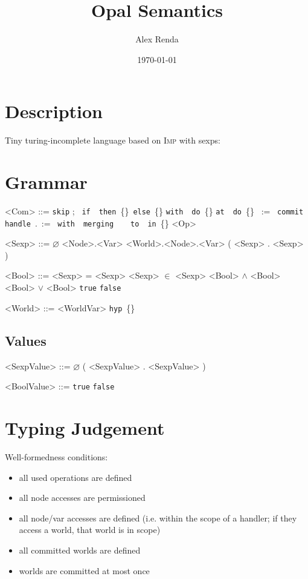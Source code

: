 \documentclass{article}
\title{Opal Semantics}
\author{Alex Renda}
\date{\today}
\newcommand{\skipcom}{\texttt{skip}}
\newcommand{\seqcom}[2]{#1;\ #2}
\newcommand{\ifcom}[3]{\texttt{if}\ #1\ \texttt{then}\ \{#2\}\ \texttt{else}\ \{#3\}}
\newcommand{\withcom}[2]{\texttt{with}\ #1\ \texttt{do}\ \{#2\}}
\newcommand{\atcom}[2]{\texttt{at}\ #1\ \texttt{do}\ \{#2\}}
\newcommand{\assgncom}[2]{#1\ :=\ #2}
\newcommand{\commitcom}[1]{\texttt{commit}\ #1}
\newcommand{\handlecom}[9]{\texttt{handle}\ #1.#2\ := \textit{#3}\ \texttt{with}\ #4\ \texttt{merging}\ #5\ #6\ #7\ \texttt{to}\ #8\ \texttt{in}\ \{#9\}}
\newcommand{\hypwrld}[1]{\texttt{hyp}\ \{#1\}}
\newcommand{\true}{\texttt{true}}
\newcommand{\false}{\texttt{false}}
\newcommand{\imp}{\textsc{Imp}\xspace}
\begin{document}
\maketitle

\section{Description}

Tiny turing-incomplete language based on \imp with sexps:

\section{Grammar}

\begin{grammar}
<Com> ::= \skipcom
\alt \seqcom{}{}
\alt \ifcom{}{\synt{Com}}{}
\alt \withcom{}{}
\alt \atcom{}{\synt{Com}}
\alt \assgncom{}{}
\alt \commitcom{}
\alt \handlecom{}{}{}{}{\synt{Var}}{\synt{Var}}{\synt{Var}}{\synt{Sexp}}{\synt{Com}}
\alt <Op>

<Sexp> ::= $\varnothing$
\alt <Node>.<Var>
\alt <World>.<Node>.<Var>
\alt ( <Sexp> . <Sexp> )

<Bool> ::= <Sexp> = <Sexp>
\alt <Sexp> $\in$ <Sexp>
\alt <Bool> $\land$ <Bool>
\alt <Bool> $\lor$ <Bool>
\alt \true
\alt \false

<World> ::= <WorldVar>
\alt \hypwrld{}

\end{grammar}

\subsection{Values}

\begin{grammar}
<SexpValue> ::= $\varnothing$
\alt ( <SexpValue> . <SexpValue> )

<BoolValue> ::= \true
\alt \false
\end{grammar}

\section{Typing Judgement}

Well-formedness conditions:
\begin{itemize}
\item all used operations are defined
\item all node accesses are permissioned
\item all node/var accesses are defined (i.e. within the scope of a handler; if they access a world, that world is in scope)
\item all committed worlds are defined
\item worlds are committed at most once
\end{itemize}
\end{document}
